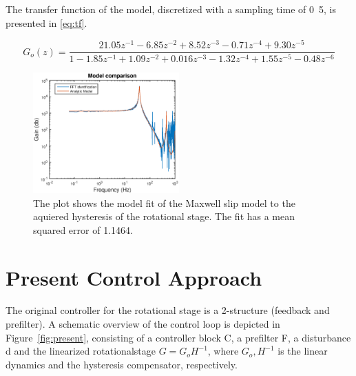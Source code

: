  The transfer function of the model, discretized with a sampling time of \unit{0.5}{\milli\second}, is presented in \eqref{eq:tf}.

\begin{equation}
  \label{eq:tf}
  G_o(z) = \frac{21.05z^{-1} - 6.85z^{-2} + 8.52z^{-3} - 0.71z^{-4} + 9.30z^{-5}}{1 - 1.85z^{-1} + 1.09z^{-2} + 0.016z^{-3} - 1.32z^{-4} + 1.55z^{-5} - 0.48z^{-6}}
\end{equation}

\begin{figure}[h]
  \centering
  \includegraphics[width=0.5\textwidth]{fig/matlab/model.eps}
  \caption{\label{fig:model} The plot shows the model fit of the Maxwell slip model to the aquiered hysteresis of the rotational stage. The fit has a mean squared error of 1.1464.}
\end{figure}


\section{Present Control Approach}
The original controller for the rotational stage is a 2-\abbrDOF structure (feedback and prefilter). A schematic overview of the control loop is depicted in Figure~\ref{fig:present}, consisting of a controller block C, a prefilter F, a disturbance d and the linearized rotationalstage $G =G_oH^{-1}$, where $G_o, H^{-1}$ is the linear dynamics and the hysteresis compensator, respectively.


